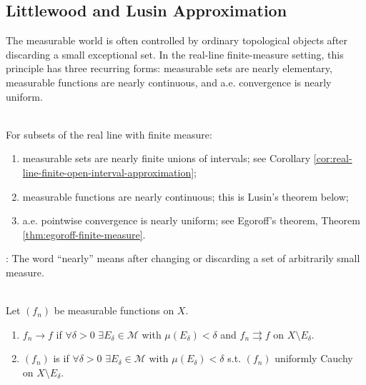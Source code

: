 \subsection{Littlewood and Lusin Approximation}

The measurable world is often controlled by ordinary topological objects after discarding a small exceptional set. In the real-line finite-measure setting, this principle has three recurring forms: measurable sets are nearly elementary, measurable functions are nearly continuous, and a.e. convergence is nearly uniform.

\begin{principle} \label{pr:littlewood-three-principles-finite-measure-real-line} \\
For subsets of the real line with finite measure:
\begin{enumerate}[label=(\roman*)]
\setlength{\itemsep}{0pt}
\item measurable sets are nearly finite unions of intervals; see Corollary \ref{cor:real-line-finite-open-interval-approximation};
\item measurable functions are nearly continuous; this is Lusin's theorem below;
\item a.e. pointwise convergence is nearly uniform; see Egoroff's theorem, Theorem \ref{thm:egoroff-finite-measure}.
\end{enumerate}
: The word ``nearly'' means after changing or discarding a set of arbitrarily small measure.
\end{principle}

\begin{definition} \label{def:almost-uniform-convergence} \\
Let $(f_n)$ be measurable functions on $X$.
\begin{enumerate}[label=(\roman*)]
\setlength{\itemsep}{0pt}
\item $f_n\to f$  if $\forall\delta>0$ $\exists E_\delta\in\mathcal{M}$ with $\mu(E_\delta)<\delta$ and $f_n\rightrightarrows f$ on $X\setminus E_\delta$.
\item $(f_n)$ is  if $\forall\delta>0$ $\exists E_\delta\in\mathcal{M}$ with $\mu(E_\delta)<\delta$ s.t. $(f_n)$ uniformly Cauchy on $X\setminus E_\delta$.
\end{enumerate}
\end{definition}

